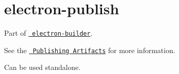 \chapter{electron-\/publish}
\hypertarget{md__2_users_2hello_2_documents_2_git_hub_2finalproject-engine-drop-table-engines_2_engine_2src_2821c5f26ce45382ec7a42700037dc341}{}\label{md__2_users_2hello_2_documents_2_git_hub_2finalproject-engine-drop-table-engines_2_engine_2src_2821c5f26ce45382ec7a42700037dc341}
\label{md__2_users_2hello_2_documents_2_git_hub_2finalproject-engine-drop-table-engines_2_engine_2src_2821c5f26ce45382ec7a42700037dc341_autotoc_md4524}%
%


Part of \href{https://github.com/electron-userland/electron-builder}{\texttt{ electron-\/builder}}.

See the \href{https://www.electron.build/publish}{\texttt{ Publishing Artifacts}} for more information.

Can be used standalone. 